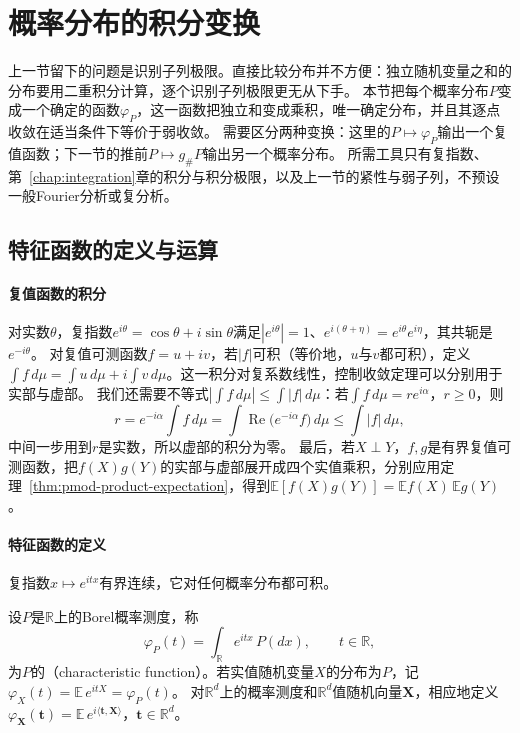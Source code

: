 \section{概率分布的积分变换}
\label{sec:wlim-characteristic}

上一节留下的问题是识别子列极限。直接比较分布并不方便：独立随机变量之和的分布要用二重积分计算，逐个识别子列极限更无从下手。
本节把每个概率分布$P$变成一个确定的函数$\varphi_P$，这一函数把独立和变成乘积，唯一确定分布，并且其逐点收敛在适当条件下等价于弱收敛。
需要区分两种变换：这里的$P\mapsto\varphi_P$输出一个复值函数；下一节的推前$P\mapsto g_\#P$输出另一个概率分布。
所需工具只有复指数、第~\ref{chap:integration}章的积分与积分极限，以及上一节的紧性与弱子列，不预设一般Fourier分析或复分析。

\subsection{特征函数的定义与运算}

\paragraph{复值函数的积分}
对实数$\theta$，复指数$e^{i\theta}=\cos\theta+i\sin\theta$满足$|e^{i\theta}|=1$、$e^{i(\theta+\eta)}=e^{i\theta}e^{i\eta}$，其共轭是$e^{-i\theta}$。
对复值可测函数$f=u+iv$，若$|f|$可积（等价地，$u$与$v$都可积），定义$\int f\,d\mu=\int u\,d\mu+i\int v\,d\mu$。这一积分对复系数线性，控制收敛定理可以分别用于实部与虚部。
我们还需要不等式$|\int f\,d\mu|\leq\int|f|\,d\mu$：若$\int f\,d\mu=re^{i\alpha}$，$r\geq0$，则
\[
  r=e^{-i\alpha}\int f\,d\mu=\int\operatorname{Re}\bigl(e^{-i\alpha}f\bigr)\,d\mu\leq\int|f|\,d\mu,
\]
中间一步用到$r$是实数，所以虚部的积分为零。
最后，若$X\perp Y$，$f,g$是有界复值可测函数，把$f(X)g(Y)$的实部与虚部展开成四个实值乘积，分别应用定理~\ref{thm:pmod-product-expectation}，得到$\mathbb E[f(X)g(Y)]=\mathbb E f(X)\,\mathbb E g(Y)$。

\paragraph{特征函数的定义}
复指数$x\mapsto e^{itx}$有界连续，它对任何概率分布都可积。

\begin{definition}[特征函数]
\label{def:wlim-characteristic}
设$P$是$\mathbb R$上的Borel概率测度，称
\[
  \varphi_P(t)=\int_{\mathbb R}e^{itx}\,P(dx),\qquad t\in\mathbb R,
\]
为$P$的（characteristic function）。若实值随机变量$X$的分布为$P$，记$\varphi_X(t)=\mathbb E\,e^{itX}=\varphi_P(t)$。
对$\mathbb R^d$上的概率测度和$\mathbb R^d$值随机向量$\bm X$，相应地定义$\varphi_{\bm X}(\bm t)=\mathbb E\,e^{i\langle\bm t,\bm X\rangle}$，$\bm t\in\mathbb R^d$。
\end{definition}

